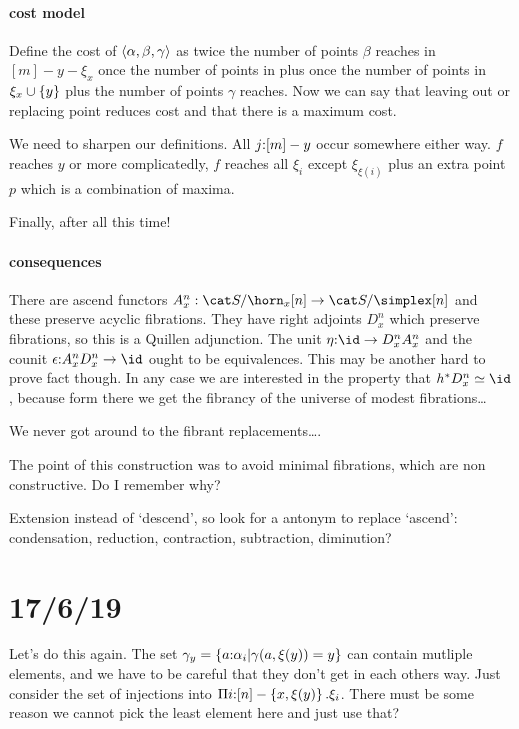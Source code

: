 \documentclass[csh.tex]{subfiles}
\begin{document}
\paragraph{cost model}
Define the cost of $\left\langle \alpha,\beta,\gamma \right\rangle$ as twice the number of points
$\beta$ reaches in $[m]-y-\xi_x$ once the number of points in 
 plus once the number of points in $\xi_x\cup\left\{y\right\}$ plus the number of points
 $\gamma$ reaches. Now we can say that leaving out or replacing point reduces 
 cost and that there is a maximum cost.

We need to sharpen our definitions.
All $j\mathord : [m]-y$ occur somewhere either way. $f$ reaches $y$ or
more complicatedly, $f$ reaches all $\xi_i$ except $\xi_{\xi(i)}$ plus an extra
point $p$ which is a combination of maxima.

Finally, after all this time!

\paragraph{consequences}
There are ascend functors $A^n_x:\cat S/\horn_x[n]\to \cat S/\simplex[n]$ and
these preserve acyclic fibrations. They have right adjoints $D^n_x$ which 
preserve fibrations, so this is a Quillen adjunction. The unit
$\eta\of\id\to D^n_xA^n_x$ and the counit $\epsilon\of A^n_xD^n_x\to\id$ ought
to be equivalences. This may be another hard to prove fact though. In any case
we are interested in the property that $h\ri D^n_x \simeq \id$, because form
there we get the fibrancy of the universe of modest fibrations\dots

We never got around to the fibrant replacements\dots.

The point of this construction was to avoid minimal fibrations,
which are non constructive. Do I remember why?

Extension instead of `descend', so look for a antonym to replace `ascend':
condensation, reduction, contraction, subtraction, diminution? 

\section{17/6/19}
Let's do this again. The set 
$\gamma_y = \left\{ a\mathord : \alpha_i | \gamma(a,\xi(y))=y \right\}$ 
can contain mutliple elements, and we have to be careful that they don't get in
each others way. Just consider the set of injections into
 $\Pi i\mathord :[n]-\left\{x,\xi(y)\right\} .\xi_i$.
There must be some reason we cannot pick the least element here and just use
that?
\end{document}
